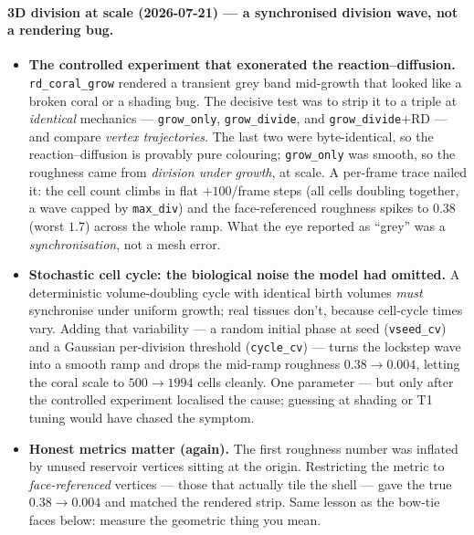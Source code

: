 \documentclass[11pt]{article}
\begin{document}
\paragraph{3D division at scale (2026-07-21) --- a synchronised division wave, not a rendering bug.}
\begin{itemize}\itemsep2pt
\item \textbf{The controlled experiment that exonerated the reaction--diffusion.}
\texttt{rd\_coral\_grow} rendered a transient grey band mid-growth that looked like a broken coral or a
shading bug. The decisive test was to strip it to a triple at \emph{identical} mechanics ---
\texttt{grow\_only}, \texttt{grow\_divide}, and \texttt{grow\_divide}$+$RD --- and compare
\emph{vertex trajectories}. The last two were byte-identical, so the reaction--diffusion is provably
pure colouring; \texttt{grow\_only} was smooth, so the roughness came from \emph{division under growth},
at scale. A per-frame trace nailed it: the cell count climbs in flat $+100$/frame steps (all cells
doubling together, a wave capped by \texttt{max\_div}) and the face-referenced roughness spikes to
$0.38$ (worst $1.7$) across the whole ramp. What the eye reported as ``grey'' was a
\emph{synchronisation}, not a mesh error.
\item \textbf{Stochastic cell cycle: the biological noise the model had omitted.} A deterministic
volume-doubling cycle with identical birth volumes \emph{must} synchronise under uniform growth; real
tissues don't, because cell-cycle times vary. Adding that variability --- a random initial phase at
seed (\texttt{vseed\_cv}) and a Gaussian per-division threshold (\texttt{cycle\_cv}) --- turns the
lockstep wave into a smooth ramp and drops the mid-ramp roughness $0.38\!\to\!0.004$, letting the coral
scale to $500\!\to\!1994$ cells cleanly. One parameter --- but only after the controlled experiment
localised the cause; guessing at shading or T1 tuning would have chased the symptom.
\item \textbf{Honest metrics matter (again).} The first roughness number was inflated by unused
reservoir vertices sitting at the origin. Restricting the metric to \emph{face-referenced} vertices ---
those that actually tile the shell --- gave the true $0.38\!\to\!0.004$ and matched the rendered strip.
Same lesson as the bow-tie faces below: measure the geometric thing you mean.
\end{itemize}
\end{document}
